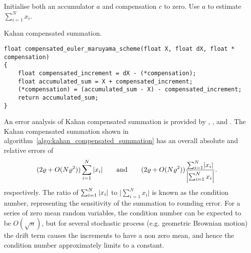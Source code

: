 \documentclass[manuscript,review]{acmart}
\begin{document}
\begin{algorithm}[htb]
\DontPrintSemicolon
{}
Initialise both an accumulator $ a $ and compensation $ c $ to zero.\;
Use $ a $ to estimate $ \sum_{i=1}^{N} x_i $.\;
\caption[Kahan compensated summation ]{Kahan compensated summation.}
\label{algo:kahan_compensated_summation}
\end{algorithm}

\begin{lstfloat}[htb]
\begin{lstlisting}[style=C, caption={C implementation of the Euler-Maruyama scheme using Kahan compensated summation from  algorithm~\ref{algo:kahan_compensated_summation}.}, label={code:c:euler_maruyama_scheme_with_kahan_compensated_summation}]
float compensated_euler_maruyama_scheme(float X, float dX, float * compensation)
{
    float compensated_increment = dX - (*compensation); 
    float accumulated_sum = X + compensated_increment;
    (*compensation) = (accumulated_sum - X) - compensated_increment;
    return accumulated_sum;
}
\end{lstlisting}
\end{lstfloat}

An error analysis of Kahan compensated summation is provided by \citet[page~791, (3.11)]{higham1993accuracy}, \citet[Excercise~19, pages 229 and 571--573]{knuth2014art}, and \citet{goldberg1991every}. The Kahan compensated summation shown in  algorithm~\ref{algo:kahan_compensated_summation} has an overall absolute and relative errors of 
\begin{equation*}
(2\varrho + O(N\varrho^2))\sum_{i=1}^{N} \abs{x_i}
\qquad \text{and} \qquad
(2\varrho + O(N\varrho^2))\dfrac{\sum_{i=1}^{N} \lvert x_i\rvert}{\left\lvert \sum_{i=1}^{N} x_i\right\rvert}. 
\end{equation*}
respectively. The ratio of
$ \sum_{i=1}^{N} \abs{x_i} $ to $\lvert \sum_{i=1}^{N} x_i\rvert $
is known as the condition number, representing the sensitivity of the summation to rounding error. For a series of zero mean random variables, the condition number can be expected to be $ O(\sqrt{n}) $, but for several stochastic process (e.g. geometric Brownian motion) the drift term causes the increments to have a non zero mean, and hence the condition number approximately limits to a constant. 
\end{document}
